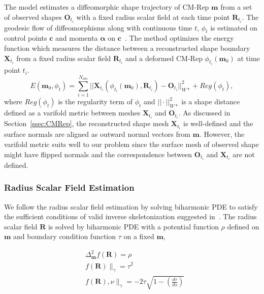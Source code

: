 \documentclass{llncs}
\begin{document}
The model estimates a diffeomorphic shape  trajectory of CM-Rep $\mathbf{m}$ from a set of observed shapes $\mathbf{O}_{t_i}$ with a fixed radius scalar field at each time point $\mathbf{R}_{t_i}$.
The geodesic flow of diffeomorphisms along with continuous time $t$, $\phi_t$ is estimated on control points $\mathbf{c}$ and momenta $\mathbf{\alpha}$ on $\mathbf{c}$~\cite{Fishbaugh2013}.
The method optimizes the energy function which measures the distance between a reconstructed shape boundary $\mathbf{X}_{t_i}$ from a fixed radius scalar field $\mathbf{R}_{t_i}$ and a deformed CM-Rep  $\phi_{t_i}( \mathbf{m}_0 )$ at time point $t_i$. 
\begin{equation}
 E( \mathbf{m}_0, \phi_t ) = \sum_{i=1}^{N_{obs}} || \mathbf{X}_{t_i} ( \phi_{t_i} (\mathbf{m}_0), \mathbf{R}_{t_i} ) - \mathbf{O}_{t_i} ||^2_{\mathit{W}*} + Reg( \phi_t ),
\end{equation}
where $Reg(\phi_t)$ is the regularity term of $\phi_t$ and $||\cdot||_{\mathit{W}*}^2$ is a shape distance defined as a varifold metric between meshes $\mathbf{X}_{t_i}$ and $\mathbf{O}_{t_i}$.
As discussed in Section~\ref{ssec:CMRep}, the reconstructed shape mesh $\mathbf{X}_{t_i}$ is well-defined and the surface normals are aligned as outward normal vectors from $\mathbf{m}$. 
However, the varifold metric suits well to our problem since the surface mesh of observed shape might have flipped normals and the correspondence between $\mathbf{O}_{t_i}$ and $\mathbf{X}_{t_i}$ are not defined. 

\subsubsection{Radius Scalar Field Estimation}
\label{sssec:RadUpdate}

We follow the radius scalar field estimation by solving biharmonic PDE to satisfy the sufficient conditions of valid inverse skeletonization suggested in~\cite{Yushkevich2009}.
The radius scalar field $\mathbf{R}$ is solved by biharmonic PDE with a potential function $\rho$ defined on $\mathbf{m}$ and boundary condition function $\tau$ on a fixed $\mathbf{m}$,

\begin{align}
 &\Delta_{\mathbf{m}}^2 f(\mathbf{R}) = \rho \\
 &f(\mathbf{R}) \|_{\gamma} = \tau^2 \\
 &f(\mathbf{R}), \nu \|_\gamma = -2 \tau \sqrt{ 1 - ( \frac{d\tau}{ds} ) } 
\label{eq:BiPDE}
\end{align}
\end{document}

